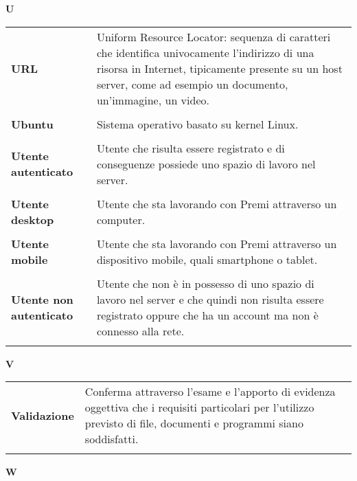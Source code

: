 \newpage 
{} 
{} 
\hfill\Huge{\textbf{U}} \\ 
\normalsize 
\begin{longtable}{L{4cm} p{10cm}}
\textbf{URL} & Uniform Resource Locator: sequenza di caratteri che identifica univocamente l'indirizzo di una risorsa in Internet, tipicamente presente su un host server, come ad esempio un documento, un'immagine, un video. \\ 
 \\ 
\textbf{Ubuntu} & Sistema operativo basato su kernel Linux. \\ 
 \\ 
\textbf{Utente autenticato} & Utente che risulta essere registrato e di conseguenze possiede uno spazio di lavoro nel server. \\ 
 \\ 
\textbf{Utente desktop} & Utente che sta lavorando con Premi attraverso un computer. \\ 
 \\ 
\textbf{Utente mobile} & Utente che sta lavorando con Premi attraverso un dispositivo mobile, quali smartphone o tablet. \\ 
 \\ 
\textbf{Utente non autenticato} & Utente che non è in possesso di uno spazio di lavoro nel server e che quindi non risulta essere registrato oppure che ha un account ma non è connesso alla rete. \\ 
 \\ 
\end{longtable} 
\newpage 
{} 
{} 
\hfill\Huge{\textbf{V}} \\ 
\normalsize 
\begin{longtable}{L{4cm} p{10cm}}
\textbf{Validazione} & Conferma attraverso l’esame e l'apporto di evidenza oggettiva che i requisiti particolari per l'utilizzo previsto di file, documenti e programmi siano soddisfatti. \\ 
 \\ 
\end{longtable} 
\newpage 
{} 
{} 
\hfill\Huge{\textbf{W}} \\ 
\normalsize 
